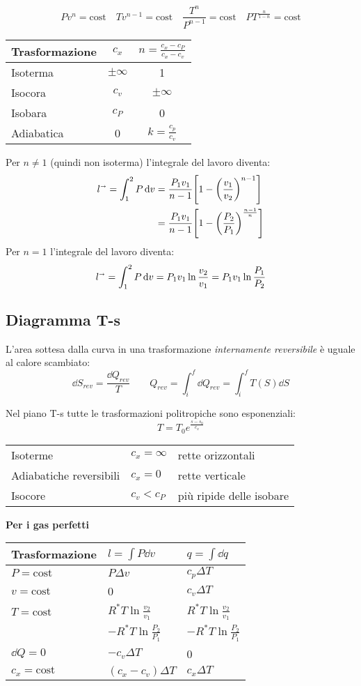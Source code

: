 \[
    Pv^n = \text{cost} \quad Tv^{n-1} = \text{cost} \quad \frac{T^n}{P^{n-1}} = \text{cost} \quad PT^{\frac{n}{1-n}} = \text{cost}
\]

\begin{tabular}{lcc}
    \toprule
    Trasformazione & $c_x$ & $n = \frac{c_x-c_P}{c_x-c_v}$ \\
    \midrule
    Isoterma & $\pm\infty$ & 1 \\
    Isocora & $c_v$ & $\pm\infty$ \\
    Isobara & $c_P$ & 0 \\
    Adiabatica & 0 & $k = \frac{c_p}{c_v}$ \\
    \bottomrule
\end{tabular}

Per $n \ne 1$ (quindi non isoterma) l'integrale del lavoro diventa:
\begin{align*}
    l^\shortrightarrow = \int_1^2 P\dd{v} &= \frac{P_1v_1}{n-1} \qty[1-\qty(\frac{v_1}{v_2})^{n-1}] \\
    &= \frac{P_1v_1}{n-1} \qty[1-\qty(\frac{P_2}{P_1})^{\frac{n-1}{n}}]
\end{align*}
Per $n = 1$ l'integrale del lavoro diventa:
\[ l^\shortrightarrow = \int_1^2 P\dd{v} = P_1v_1\ln{\frac{v_2}{v_1}} = P_1v_1\ln{\frac{P_1}{P_2}} \]

\subsection{Diagramma T-s}

L'area sottesa dalla curva in una trasformazione \emph{internamente reversibile} è uguale al calore scambiato:
\[ \dd{S}_{rev} = \frac{\dd{Q}_{rev}}{T} \qquad Q_{rev} = \int_i^f \dd{Q}_{rev} = \int_i^f T(S) \dd{S} \]

Nel piano T-s tutte le trasformazioni politropiche sono esponenziali:
\[T = T_0 e ^ { \frac{s-s_0}{c_x} }\]

\begin{tabular}{lll}
    Isoterme & $c_x = \infty$ & rette orizzontali \\
    Adiabatiche reversibili & $c_x = 0$ & rette verticale \\
    Isocore & $c_v < c_P$ & più ripide delle isobare \\
\end{tabular}

\textbf{Per i gas perfetti}
\begin{tabular}{lll}
    \toprule
    Trasformazione & $l=\int P\dd{v}$ & $q = \int \dd{q}$ \\
    \midrule
    $P = \text{cost}$ & $P\Delta v$ & $c_p\Delta T$ \\
    $v = \text{cost}$ & 0 & $c_v\Delta T$ \\
    $T = \text{cost}$ & $R^*T\ln{\frac{v_2}{v_1}}$ & $R^*T\ln{\frac{v_2}{v_1}}$ \\
    & $-R^*T\ln{\frac{P_2}{P_1}}$ & $-R^*T\ln{\frac{P_2}{P_1}}$ \\
    $\dd{Q}=0$ & $-c_v\Delta T$ & 0 \\
    $c_x = \text{cost}$ & $(c_x-c_v)\Delta T$ & $c_x\Delta T$ \\
    \bottomrule
\end{tabular}

